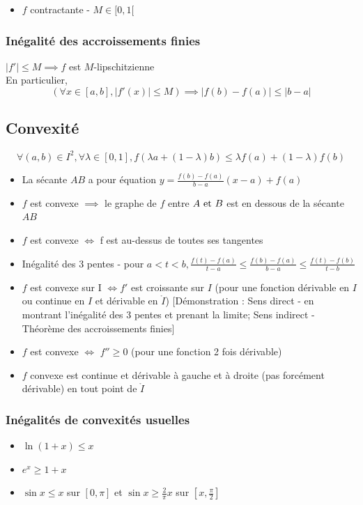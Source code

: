 \documentclass[openany]{book}
\begin{document}
\begin{itemize}
    \item $f$ contractante - $M \in [0, 1[$
\end{itemize}

\subsubsection{Inégalité des accroissements finies}

$|f'| \leq M \implies f$ est $M$-lipschitzienne \\

En particulier,
\[ \left( \forall x \in [a, b], |f'(x)| \leq M \right) \implies |f(b) - f(a)| \leq |b-a| \]

\subsection{Convexité}
\[ \forall (a, b) \in I^2, \forall \lambda \in [0, 1], f(\lambda a + (1-\lambda) b) \leq \lambda f(a) + (1-\lambda)f(b) \]

\begin{itemize}
    \item La sécante $AB$ a pour équation $y = \frac{f(b) - f(a)}{b-a}(x-a) + f(a)$
    \item $f$ est convexe $\implies$ le graphe de $f$ entre $A \text{ et } B$ est en dessous de la sécante $AB$
    \item $f$ est convexe $\iff$ f est au-dessus de toutes ses tangentes
    \item Inégalité des 3 pentes - pour $a < t < b, \frac{f(t)-f(a)}{t-a} \leq \frac{f(b)-f(a)}{b-a} \leq \frac{f(t)-f(b)}{t-b}$
    \item $f$ est convexe sur I $\iff f'$ est croissante sur $I$ (pour une fonction dérivable en $I$ ou continue en $I$ et dérivable en $\mathring{I}$) [Démonstration : Sens direct - en montrant l'inégalité des 3 pentes et prenant la limite; Sens indirect - Théorème des accroissements finies]
    \item $f$ est convexe $\iff$ $f'' \geq 0$ (pour une fonction 2 fois dérivable)
    \item $f$ convexe est continue et dérivable à gauche et à droite (pas forcément dérivable) en tout point de $\mathring{I}$
\end{itemize}

\subsubsection{Inégalités de convexités usuelles}
\begin{itemize}
    \item $\ln(1+x) \leq x$ 
    \item $e^x \geq 1+x$ 
    \item $\sin x \leq x$ sur $[0, \pi]$ et $\sin x \geq \frac{2}{\pi}x$ sur $[x, \frac{\pi}{2}]$
\end{itemize}
\end{document}
